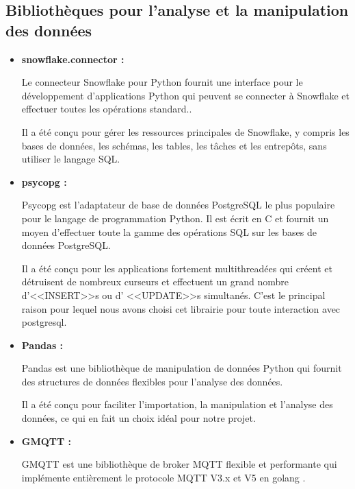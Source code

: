 \subsection{Bibliothèques pour l'analyse et la manipulation des données}
    \begin{itemize}
        \item\textbf{snowflake.connector : }
                 \par Le connecteur Snowflake pour Python fournit une interface pour le développement d'applications Python
                  qui peuvent se connecter à Snowflake et effectuer toutes les opérations standard.\cite{sncn}. 
                 \par Il a été conçu pour gérer les ressources principales de Snowflake, y compris les bases de données, les schémas, les tables, les tâches et les entrepôts, sans utiliser le langage SQL.
        \item\textbf{psycopg : }
                \par Psycopg est l'adaptateur de base de données PostgreSQL le plus populaire pour le langage de programmation Python. 
                Il est écrit en C et fournit un moyen d'effectuer toute la gamme des opérations SQL sur les bases de données PostgreSQL\cite{psycopg}. 
                \par Il a été conçu pour les applications fortement multithreadées qui créent et détruisent de nombreux curseurs et effectuent un grand nombre d'<<INSERT>>s ou d' <<UPDATE>>s simultanés. C'est le principal raison pour lequel nous avons choisi cet librairie pour toute interaction avec postgresql.
        \item\textbf{Pandas : }
                    \par  Pandas est une bibliothèque de manipulation de données Python qui fournit des structures de données flexibles pour l'analyse des données\cite{pandas}. 
                    \par Il a été conçu pour faciliter l'importation, la manipulation et l'analyse des données, ce qui en fait un choix idéal pour notre projet.
        \item \textbf{GMQTT : }
            \par GMQTT est une bibliothèque de broker MQTT flexible et performante qui implémente entièrement le protocole MQTT V3.x et V5 en golang \cite{gmqtt}. 
   \end{itemize}

